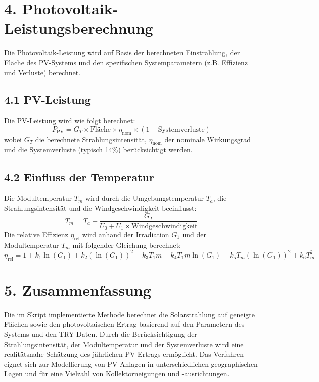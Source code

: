 \documentclass{article}
\begin{document}
\section*{4. Photovoltaik-Leistungsberechnung}
Die Photovoltaik-Leistung wird auf Basis der berechneten Einstrahlung, der Fläche des PV-Systems und den spezifischen Systemparametern (z.B. Effizienz und Verluste) berechnet.

\subsection*{4.1 PV-Leistung}
Die PV-Leistung wird wie folgt berechnet:
\[
P_{\text{PV}} = G_T \times \text{Fläche} \times \eta_{\text{nom}} \times (1 - \text{Systemverluste})
\]
wobei \( G_T \) die berechnete Strahlungsintensität, \( \eta_{\text{nom}} \) der nominale Wirkungsgrad und die Systemverluste (typisch 14\%) berücksichtigt werden.

\subsection*{4.2 Einfluss der Temperatur}
Die Modultemperatur \( T_m \) wird durch die Umgebungstemperatur \( T_a \), die Strahlungsintensität und die Windgeschwindigkeit beeinflusst:
\[
T_m = T_a + \frac{G_T}{U_0 + U_1 \times \text{Windgeschwindigkeit}}
\]
Die relative Effizienz \( \eta_{\text{rel}} \) wird anhand der Irradiation \( G_1 \) und der Modultemperatur \( T_m \) mit folgender Gleichung berechnet:
\[
\eta_{\text{rel}} = 1 + k_1 \ln(G_1) + k_2 (\ln(G_1))^2 + k_3 T_1m + k_4 T_1m \ln(G_1) + k_5 T_m (\ln(G_1))^2 + k_6 T_m^2
\]

\section*{5. Zusammenfassung}
Die im Skript implementierte Methode berechnet die Solarstrahlung auf geneigte Flächen sowie den photovoltaischen Ertrag basierend auf den Parametern des Systems und den TRY-Daten. Durch die Berücksichtigung der Strahlungsintensität, der Modultemperatur und der Systemverluste wird eine realitätsnahe Schätzung des jährlichen PV-Ertrags ermöglicht. Das Verfahren eignet sich zur Modellierung von PV-Anlagen in unterschiedlichen geographischen Lagen und für eine Vielzahl von Kollektorneigungen und -ausrichtungen.
\end{document}
